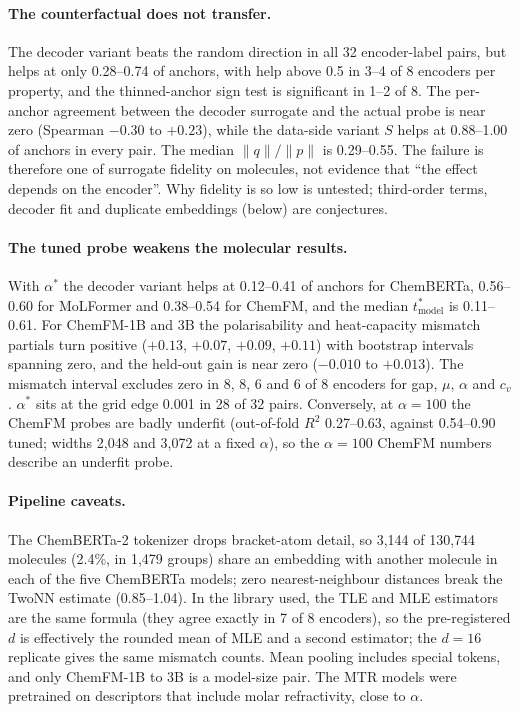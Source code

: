 \documentclass[10pt]{article}
\newcommand{\norm}[1]{\lVert #1 \rVert}
\newcommand{\tmodel}{t^*_{\mathrm{model}}}
\begin{document}
\paragraph{The counterfactual does not transfer.} The decoder variant beats the random direction in all 32 encoder-label pairs, but helps at only 0.28--0.74 of anchors, with help above 0.5 in 3--4 of 8 encoders per property, and the thinned-anchor sign test is significant in 1--2 of 8. The per-anchor agreement between the decoder surrogate and the actual probe is near zero (Spearman $-0.30$ to $+0.23$), while the data-side variant $S$ helps at 0.88--1.00 of anchors in every pair. The median $\norm{q}/\norm{p}$ is 0.29--0.55. %
The failure is therefore one of surrogate fidelity on molecules, not evidence that ``the effect depends on the encoder''. Why fidelity is so low is untested; third-order terms, decoder fit and duplicate embeddings (below) are conjectures.

\paragraph{The tuned probe weakens the molecular results.} With $\alpha^*$ the decoder variant helps at 0.12--0.41 of anchors for ChemBERTa, 0.56--0.60 for MoLFormer and 0.38--0.54 for ChemFM, and the median $\tmodel$ is 0.11--0.61. For ChemFM-1B and 3B the polarisability and heat-capacity mismatch partials turn positive ($+0.13$, $+0.07$, $+0.09$, $+0.11$) with bootstrap intervals spanning zero, and the held-out gain is near zero ($-0.010$ to $+0.013$). The mismatch interval excludes zero in 8, 8, 6 and 6 of 8 encoders for gap, $\mu$, $\alpha$ and $c_v$. $\alpha^*$ sits at the grid edge 0.001 in 28 of 32 pairs. %
Conversely, at $\alpha=100$ the ChemFM probes are badly underfit (out-of-fold $R^2$ 0.27--0.63, against 0.54--0.90 tuned; widths 2{,}048 and 3{,}072 at a fixed $\alpha$), so the $\alpha=100$ ChemFM numbers describe an underfit probe.

\paragraph{Pipeline caveats.} The ChemBERTa-2 tokenizer drops bracket-atom detail, so 3{,}144 of 130{,}744 molecules (2.4\%, in 1{,}479 groups) share an embedding with another molecule in each of the five ChemBERTa models; zero nearest-neighbour distances break the TwoNN estimate (0.85--1.04). In the library used, the TLE and MLE estimators are the same formula (they agree exactly in 7 of 8 encoders), so the pre-registered $d$ is effectively the rounded mean of MLE and a second estimator; the $d=16$ replicate gives the same mismatch counts. Mean pooling includes special tokens, and only ChemFM-1B to 3B is a model-size pair. The MTR models were pretrained on descriptors that include molar refractivity, close to $\alpha$. %
\end{document}
